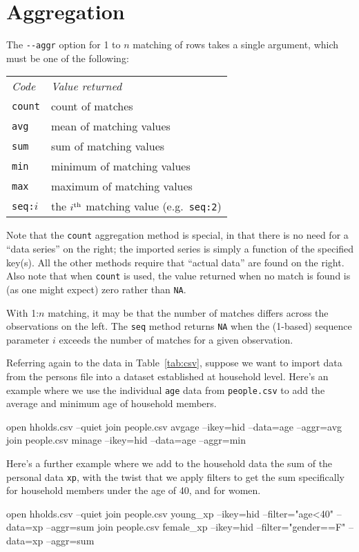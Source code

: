 \section{Aggregation}
\label{sec:join-aggr}

The \verb|--aggr| option for 1 to $n$ matching of rows takes a single
argument, which must be one of the following:

\begin{center}
\begin{tabular}{ll}
\textit{Code} & \textit{Value returned} \\[6pt]
\texttt{count} & count of matches \\
\texttt{avg} & mean of matching values \\
\texttt{sum} & sum of matching values \\
\texttt{min} & minimum of matching values \\
\texttt{max} & maximum of matching values \\
\texttt{seq:}$i$ & the $i^{\rm th}$ matching value (e.g.\ \texttt{seq:2}) 
\end{tabular}
\end{center}

Note that the \texttt{count} aggregation method is special, in that
there is no need for a ``data series'' on the right; the imported
series is simply a function of the specified key(s). All the other
methods require that ``actual data'' are found on the right.  Also
note that when \texttt{count} is used, the value returned when no
match is found is (as one might expect) zero rather than \texttt{NA}.

With 1:$n$ matching, it may be that the number of matches differs
across the observations on the left. The \texttt{seq} method returns
\texttt{NA} when the (1-based) sequence parameter $i$ exceeds the
number of matches for a given observation.

Referring again to the data in Table~\ref{tab:csv}, suppose we want to
import data from the persons file into a dataset established at
household level.  Here's an example where we use the individual
\texttt{age} data from \texttt{people.csv} to add the average and
minimum age of household members.
\begin{code}
open hholds.csv --quiet
join people.csv avgage --ikey=hid --data=age --aggr=avg
join people.csv minage --ikey=hid --data=age --aggr=min
\end{code}

Here's a further example where we add to the household data the sum of
the personal data \texttt{xp}, with the twist that we apply filters to
get the sum specifically for household members under the age of 40,
and for women.
\begin{code}
open hholds.csv --quiet
join people.csv young_xp --ikey=hid --filter="age<40" --data=xp --aggr=sum
join people.csv female_xp --ikey=hid --filter="gender==F" --data=xp --aggr=sum
\end{code}

